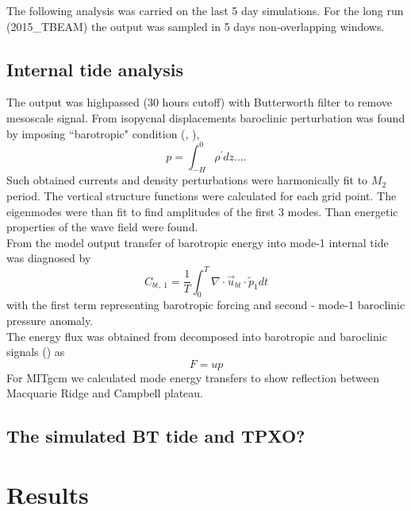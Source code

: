 The following analysis was carried on the last 5 day simulations. For the long run (2015\_TBEAM) the output was sampled in 5 days non-overlapping windows.\\


\subsection{Internal tide analysis}
The output was highpassed (30 hours cutoff) with Butterworth filter to remove mesoscale signal. From isopycnal displacements baroclinic perturbation was found by imposing ``barotropic" condition (\cite{kunze2002internal}, \cite{kelly2010}),
\begin{equation}
p = \int_{-H}^0 \rho^{\prime} dz ....
\end{equation}
Such obtained currents and density perturbations were harmonically fit to $M_2$ period. The vertical structure functions were calculated for each grid point. The eigenmodes were than fit to find amplitudes of the first 3 modes. Than energetic properties of the wave field were found.\\
From the model output transfer of barotropic energy into mode-1 internal tide was diagnosed by
\begin{equation}
C_{bt,~1} = \frac{1}{T} \int_0^T \nabla \cdot \vec{u}_{bt} \cdot \tilde{p}_{1} dt
\end{equation}
with the first term representing barotropic forcing and second - mode-1 baroclinic pressure anomaly.\\
The energy flux was obtained from decomposed into barotropic and baroclinic signals (\cite{cummins1997simulation}) as
\begin{equation}
F = u p
\end{equation}
For MITgcm we calculated mode energy transfers to show reflection between Macquarie Ridge and Campbell plateau.\\

\subsection{The simulated BT tide and TPXO?}

\section{Results}
